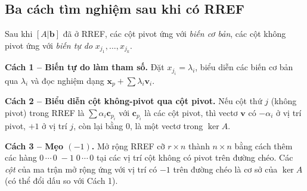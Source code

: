 \documentclass[12pt,a4paper]{article}
\begin{document}
\begin{center}
\end{center}

\subsection{Ba cách tìm nghiệm sau khi có RREF}

\begin{phuongphap}[title={Ba cách đọc nghiệm từ RREF}]
Sau khi $[A|\mathbf{b}]$ đã ở RREF, các cột pivot ứng với \emph{biến cơ bản}, các cột không pivot ứng với \emph{biến tự do} $x_{j_1}, \ldots, x_{j_k}$.

\medskip
\textbf{Cách 1 -- Biến tự do làm tham số.} Đặt $x_{j_i} = \lambda_i$, biểu diễn các biến cơ bản qua $\lambda_i$ và đọc nghiệm dạng $\mathbf{x}_p + \sum \lambda_i \mathbf{v}_i$.

\medskip
\textbf{Cách 2 -- Biểu diễn cột không-pivot qua cột pivot.} Nếu cột thứ $j$ (không pivot) trong RREF là $\sum \alpha_i \mathbf{c}_{p_i}$ với $\mathbf{c}_{p_i}$ là các cột pivot, thì vectơ $\mathbf{v}$ có $-\alpha_i$ ở vị trí pivot, $+1$ ở vị trí $j$, còn lại bằng 0, là một vectơ trong $\ker A$.

\medskip
\textbf{Cách 3 -- Mẹo $(-1)$.} Mở rộng RREF cỡ $r \times n$ thành $n \times n$ bằng cách thêm các hàng $0\,\cdots\,0\;-1\;0\,\cdots\,0$ tại các vị trí cột không có pivot trên đường chéo. Các \emph{cột} của ma trận mở rộng ứng với vị trí có $-1$ trên đường chéo là cơ sở của $\ker A$ (có thể đổi dấu so với Cách 1).
\end{phuongphap}
\end{document}
